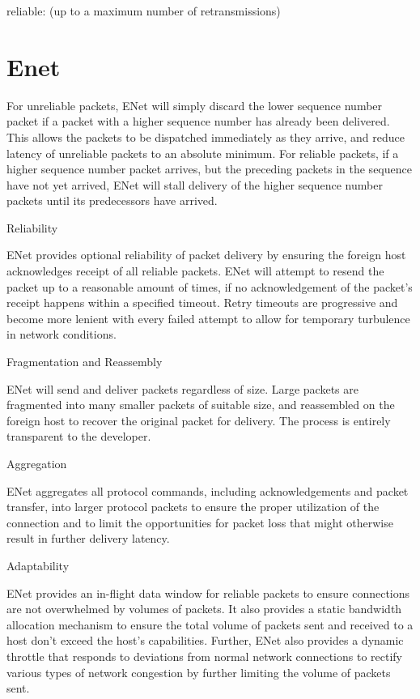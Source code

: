 reliable: (up to a maximum number of retransmissions)
\section{Enet}

For unreliable packets, ENet will simply discard the lower sequence number packet if a packet with a higher sequence number has already been delivered. This allows the packets to be dispatched immediately as they arrive, and reduce latency of unreliable packets to an absolute minimum. For reliable packets, if a higher sequence number packet arrives, but the preceding packets in the sequence have not yet arrived, ENet will stall delivery of the higher sequence number packets until its predecessors have arrived.


Reliability

ENet provides optional reliability of packet delivery by ensuring the foreign host acknowledges receipt of all reliable packets. ENet will attempt to resend the packet up to a reasonable amount of times, if no acknowledgement of the packet's receipt happens within a specified timeout. Retry timeouts are progressive and become more lenient with every failed attempt to allow for temporary turbulence in network conditions.

Fragmentation and Reassembly

ENet will send and deliver packets regardless of size. Large packets are fragmented into many smaller packets of suitable size, and reassembled on the foreign host to recover the original packet for delivery. The process is entirely transparent to the developer.

Aggregation

ENet aggregates all protocol commands, including acknowledgements and packet transfer, into larger protocol packets to ensure the proper utilization of the connection and to limit the opportunities for packet loss that might otherwise result in further delivery latency.

Adaptability

ENet provides an in-flight data window for reliable packets to ensure connections are not overwhelmed by volumes of packets. It also provides a static bandwidth allocation mechanism to ensure the total volume of packets sent and received to a host don't exceed the host's capabilities. Further, ENet also provides a dynamic throttle that responds to deviations from normal network connections to rectify various types of network congestion by further limiting the volume of packets sent.

